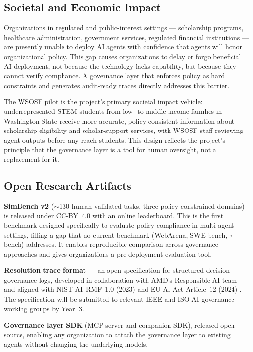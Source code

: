\documentclass[11pt]{article}
\begin{document}
\subsection{Societal and Economic Impact}

Organizations in regulated and public-interest settings --- scholarship programs, healthcare administration, government services, regulated financial institutions --- are presently unable to deploy AI agents with confidence that agents will honor organizational policy. This gap causes organizations to delay or forgo beneficial AI deployment, not because the technology lacks capability, but because they cannot verify compliance. A governance layer that enforces policy as hard constraints and generates audit-ready traces directly addresses this barrier.

The WSOSF pilot is the project's primary societal impact vehicle: underrepresented STEM students from low- to middle-income families in Washington State receive more accurate, policy-consistent information about scholarship eligibility and scholar-support services, with WSOSF staff reviewing agent outputs before any reach students. This design reflects the project's principle that the governance layer is a tool for human oversight, not a replacement for it.

\subsection{Open Research Artifacts}

\textbf{SimBench v2} ($\sim$130 human-validated tasks, three policy-constrained domains) is released under CC-BY~4.0 with an online leaderboard. This is the first benchmark designed specifically to evaluate policy compliance in multi-agent settings, filling a gap that no current benchmark (WebArena, SWE-bench, $\tau$-bench) addresses. It enables reproducible comparison across governance approaches and gives organizations a pre-deployment evaluation tool.

\textbf{Resolution trace format} --- an open specification for structured decision-governance logs, developed in collaboration with AMD's Responsible AI team and aligned with NIST AI~RMF~1.0 (2023) \citep{nist2023rmf} and EU AI Act Article~12 (2024) \citep{euaiact2024}. The specification will be submitted to relevant IEEE and ISO AI governance working groups by Year~3.

\textbf{Governance layer SDK} (MCP server and companion SDK), released open-source, enabling any organization to attach the governance layer to existing agents without changing the underlying models.
\end{document}
